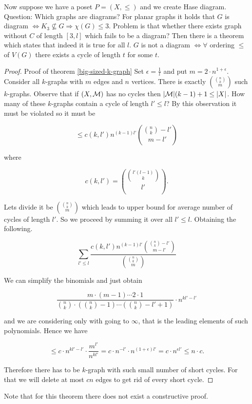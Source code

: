 Now suppose we have a poset $P = (X, \leq)$ and we create Hase diagram. Question: Which graphs are diagrams? For planar graphs it holds that $G$ is diagram $\iff K_{3} \nsubseteq G \Rightarrow \chi(G) \leq 3$. Problem is that whether there exists graph without $C$ of length $[3, l]$ which fails to be a diagram? Then there is a theorem which states that indeed it is true for all $l$. $G$ is not a diagram $\iff \forall$ ordering $\leq$ of $V(G)$ there exists a cycle of length $t$ for some $t$.

\begin{proof}{Proof of theorem \ref{big-sized-k-graph}}
	Set $\epsilon = \frac{1}{l}$ and put $m = 2 \cdot n^{1+\epsilon}$. Consider all $k$-graphs with $m$ edges and $n$ vertices. There is exactly $\binom{\binom{n}{k}}{m}$ such $k$-graphs. Observe that if $(X, \mathcal{M})$ has no cycles then $|\mathcal{M}| (k - 1) + 1 \leq |X|$. How many of these $k$-graphs contain a cycle of length $l' \leq l$? By this observation it must be violated so it must be
	
	$$
	\leq c(k, l') n^{(k-1)l'} \binom{\binom{n}{k} - l'}{m - l'}
	$$
	
	\noindent where
	
	$$
	c(k, l') = \binom{\binom{l'(l-1)}{k}}{l'}.
	$$
	
	Lets divide it be $\binom{\binom{n}{k}}{m}$ which leads to upper bound for average number of cycles of length $l'$. So we proceed by summing it over all $l' \leq l$.  Obtaining the following.
	
	$$
	\sum_{l' \leq l} \frac{c(k, l') n^{(k-1)l'} \binom{\binom{n}{k} - l'}{m - l'}}{\binom{\binom{n}{k}}{m}}
	$$
	
	We can simplify the binomials and just obtain
	
	$$
	\frac{m \cdot (m - 1) \cdots 2 \cdot 1}{\binom{n}{k} \cdot (\binom{n}{k} - 1) \cdots (\binom{n}{k} - l' + 1)} \cdot n^{kl' - l'}
	$$
	
	\noindent and we are considering only with going to $\infty$, that is the leading elements of such polynomials. Hence we have
	
	$$
	\leq c \cdot n^{kl' - l'} \cdot \frac{m^{l'}}{n^{kl'}} = c \cdot n^{-l'} \cdot n^{(1 + \epsilon) l'} = c \cdot n^{\epsilon l'} \leq n \cdot c.
	$$
	
	Therefore there has to be $k$-graph with such small number of short cycles. For that we will delete at most $cn$ edges to get rid of every short cycle.
\end{proof}

Note that for this theorem there does not exist a constructive proof.

